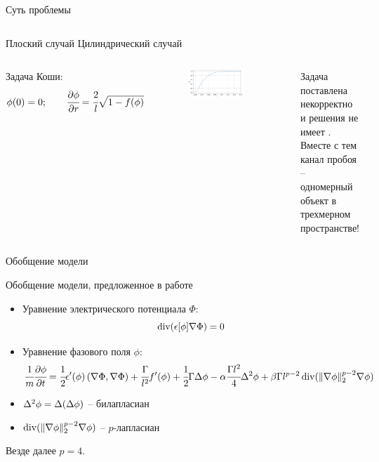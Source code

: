 \begin{frame}{Суть проблемы}
\begin{columns}
	\centering
	Плоский случай
	\centering
	Цилиндрический случай
\end{columns}
\vspace{0.5cm}
\begin{columns}
	Задача Коши:
	\vspace{-0.3cm}
	$$\phi(0) = 0; \qquad \cfrac{\partial \phi}{\partial r} = \cfrac{2}{l} \sqrt{1 - f(\phi)}$$
	\vspace{-0.3cm}
	\begin{figure}
		\includegraphics[width=\textwidth]{figures/result_volumes.png}
	\end{figure}
	\rule{0.4pt}{0.7\textheight}
	\centering
	Задача поставлена некорректно \\ и решения не имеет \cite{zipunova_higher_codimension}. \\[0.2cm]
	Вместе с тем канал пробоя -- одномерный объект в трехмерном пространстве!
\end{columns}
\end{frame}


\begin{frame}{Обобщение модели}
\vspace{-0.3cm}
\begin{block}{Обобщение модели, предложенное в работе \cite{zipunova_higher_codimension}}
\begin{itemize}
	\item Уравнение электрического потенциала $\Phi$:
	$$\operatorname{{div}}(\epsilon[\phi] \nabla \Phi) = 0$$
	\item Уравнение фазового поля $\phi$:
	$$\cfrac{1}{m} \cfrac{\partial \phi}{\partial t} = \cfrac{1}{2} \epsilon'(\phi) \left( \nabla \Phi, \nabla \Phi \right) + \cfrac{\Gamma}{l^2} f'(\phi) + \cfrac{1}{2} \Gamma \Delta \phi - \alpha \cfrac{\Gamma l^2}{4} \Delta^2 \phi + \beta \Gamma l^{p - 2} \operatorname{{div}}(\| \nabla \phi \|_2^{p - 2} \nabla \phi)$$
\end{itemize}
\end{block}
\begin{itemize}
	\item $\Delta^2 \phi = \Delta(\Delta \phi)$ -- билапласиан
	\item $\operatorname{{div}}(\| \nabla \phi \|_2^{p - 2} \nabla \phi)$ -- $p$-лапласиан
\end{itemize}
Везде далее $p = 4$.
\end{frame}


